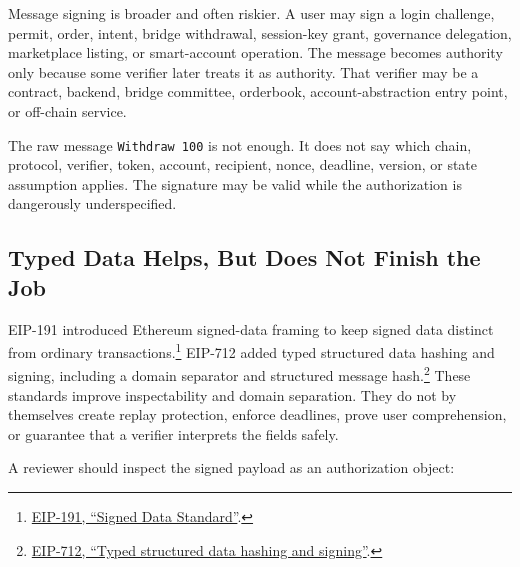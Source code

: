 Message signing is broader and often riskier. A user may sign a login challenge, permit, order, intent, bridge withdrawal, session-key grant, governance delegation, marketplace listing, or smart-account operation. The message becomes authority only because some verifier later treats it as authority. That verifier may be a contract, backend, bridge committee, orderbook, account-abstraction entry point, or off-chain service.

The raw message \texttt{Withdraw 100} is not enough. It does not say which chain, protocol, verifier, token, account, recipient, nonce, deadline, version, or state assumption applies. The signature may be valid while the authorization is dangerously underspecified.

\subsection{Typed Data Helps, But Does Not Finish the Job}

EIP-191 introduced Ethereum signed-data framing to keep signed data distinct from ordinary transactions.\footnote{\href{https://eips.ethereum.org/EIPS/eip-191}{EIP-191, ``Signed Data Standard''}.} EIP-712 added typed structured data hashing and signing, including a domain separator and structured message hash.\footnote{\href{https://eips.ethereum.org/EIPS/eip-712}{EIP-712, ``Typed structured data hashing and signing''}.} These standards improve inspectability and domain separation. They do not by themselves create replay protection, enforce deadlines, prove user comprehension, or guarantee that a verifier interprets the fields safely.

A reviewer should inspect the signed payload as an authorization object:

